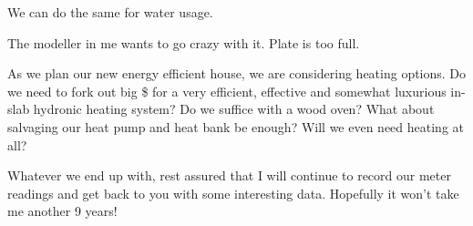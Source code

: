 \documentclass[]{article}
\begin{document}
We can do the same for water usage.

The modeller in me wants to go crazy with it. Plate is too full.

As we plan our new energy efficient house, we are considering heating
options. Do we need to fork out big \$ for a very efficient, effective
and somewhat luxurious in-slab hydronic heating system? Do we suffice
with a wood oven? What about salvaging our heat pump and heat bank be
enough? Will we even need heating at all?

Whatever we end up with, rest assured that I will continue to record our
meter readings and get back to you with some interesting data. Hopefully
it won't take me another 9 years!
\end{document}
